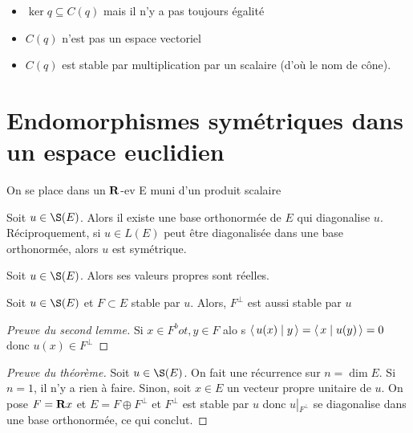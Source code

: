 \begin{rem}
\begin{itemize}
    \item $\ker q\subseteq C(q)$ mais il n'y a pas toujours égalité
    \item  $C(q)$ n'est pas un espace vectoriel
    \item  $C(q)$ est stable par multiplication par un scalaire (d'où le nom de cône).
\end{itemize}
\end{rem}

\section{Endomorphismes symétriques dans un espace euclidien}


On se place dans un $ \mathbf R$-ev E muni d'un produit scalaire

\begin{thm}
    Soit $u \in  \S(E)$. Alors il existe une base orthonormée de $E$ qui diagonalise  $u$. Réciproquement, si  $u \in  L(E)$ peut être diagonalisée dans une base orthonormée, alors  $u$ est symétrique.
\end{thm}

\begin{lmm}
    Soit $u \in  \S(E)$. Alors ses valeurs propres sont réelles.
\end{lmm}

\begin{lmm}
    Soit $u \in  \S(E)$ et $F\subset E$ stable par  $u$. Alors,  $F^\bot$ est aussi stable par  $u$
\end{lmm}

\begin{proof}[Preuve du second lemme]
    Si $x \in  F^bot, y \in  F$ alo s $ \scalar{u(x)}{y}= \scalar{x}{u(y)}=0  $ donc $u(x)\in F^\bot$
\end{proof}

\begin{proof}[Preuve du théorème]
    Soit $u \in  \S(E)$. On fait une récurrence sur $n=\dim E$. Si  $n=1$, il n'y a rien à faire. Sinon, soit  $x\in  E$ un vecteur propre unitaire de $u$. On pose $F=\mathbf R x$ et $E=F\oplus F^\bot$ et  $F^\bot$ est stable par  $u$ donc  $u\left|_{F^\bot}\right.$ se diagonalise dans une base orthonormée, ce qui conclut.
\end{proof}


